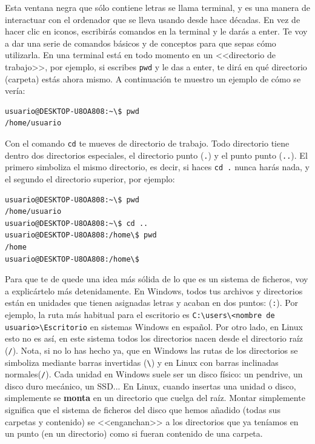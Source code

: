 \documentclass[a4paper]{article}
\begin{document}
Esta ventana negra que sólo contiene letras se llama terminal, y es una manera
de interactuar con el ordenador que se lleva usando desde hace décadas. En vez
de hacer clic en iconos, escribirás comandos en la terminal y le darás a enter.
Te voy a dar una serie de comandos básicos y de conceptos para que sepas cómo
utilizarla. En una terminal está en todo momento en un <<directorio de trabajo>>,
por ejemplo, si escribes \verb!pwd! y le das a enter, te dirá en qué
directorio (carpeta) estás ahora mismo. A continuación te muestro un ejemplo
de cómo se vería:


\noindent
\begin{minipage}[H]{\linewidth}
\mbox{}
\begin{lstlisting}[style=terminalStyle]
usuario@DESKTOP-U8OA808:~\$ pwd
/home/usuario
\end{lstlisting}
\end{minipage}

Con el comando \verb!cd! te mueves de directorio de trabajo. Todo directorio
tiene dentro dos directorios especiales, el directorio punto (\verb!.!) y el
punto punto (\verb!..!). El primero simboliza el mismo directorio, es decir,
si haces \verb!cd .! nunca harás nada, y el segundo el directorio superior,
por ejemplo:

\noindent
\begin{minipage}[H]{\linewidth}
\mbox{}
\begin{lstlisting}[style=terminalStyle]
usuario@DESKTOP-U8OA808:~\$ pwd
/home/usuario
usuario@DESKTOP-U8OA808:~\$ cd ..
usuario@DESKTOP-U8OA808:/home\$ pwd
/home
usuario@DESKTOP-U8OA808:/home\$
\end{lstlisting}
\end{minipage}

Para que te de quede una idea más sólida de lo que es un sistema de ficheros,
voy a explicártelo más detenidamente. En Windows, todos tus archivos y
directorios están en unidades que tienen asignadas letras y acaban en dos
puntos: (\verb!:!). Por ejemplo, la ruta más habitual para el escritorio es
\verb!C:\users\<nombre de usuario>\Escritorio! en sistemas Windows en español.
Por otro
lado, en Linux esto no es así, en este sistema todos los directorios nacen
desde el directorio raíz (\verb!/!). Nota, si no lo has hecho ya, que en Windows
las rutas de los directorios se simboliza mediante barras invertidas (\verb!\!)
y en Linux con barras inclinadas normales(\verb!/!).
Cada unidad en Windows suele ser un
disco físico: un pendrive, un disco duro mecánico, un SSD... En Linux, cuando
insertas una unidad o disco, simplemente se \textbf{monta} en un
directorio que cuelga del raíz. Montar simplemente significa que el sistema de
ficheros del disco que hemos añadido (todas sus carpetas y contenido) se
<<enganchan>> a los directorios que ya teníamos en un punto (en un directorio)
como si fueran contenido de una carpeta.
\end{document}
